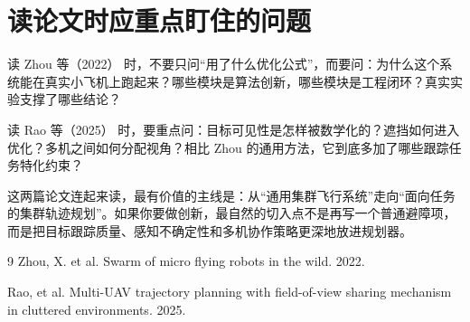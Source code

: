 ﻿\documentclass[UTF8,a4paper,11pt]{ctexart}
\newcommand{\Rao}{Rao 等（2025）}
\newcommand{\Zhou}{Zhou 等（2022）}
\begin{document}
\section{读论文时应重点盯住的问题}

读 \Zhou{} 时，不要只问“用了什么优化公式”，而要问：为什么这个系统能在真实小飞机上跑起来？哪些模块是算法创新，哪些模块是工程闭环？真实实验支撑了哪些结论？

读 \Rao{} 时，要重点问：目标可见性是怎样被数学化的？遮挡如何进入优化？多机之间如何分配视角？相比 Zhou 的通用方法，它到底多加了哪些跟踪任务特化约束？

这两篇论文连起来读，最有价值的主线是：从“通用集群飞行系统”走向“面向任务的集群轨迹规划”。如果你要做创新，最自然的切入点不是再写一个普通避障项，而是把目标跟踪质量、感知不确定性和多机协作策略更深地放进规划器。

\begin{thebibliography}{9}
Zhou, X. et al. Swarm of micro flying robots in the wild. 2022.

Rao, et al. Multi-UAV trajectory planning with field-of-view sharing mechanism in cluttered environments. 2025.
\end{thebibliography}
\end{document}
